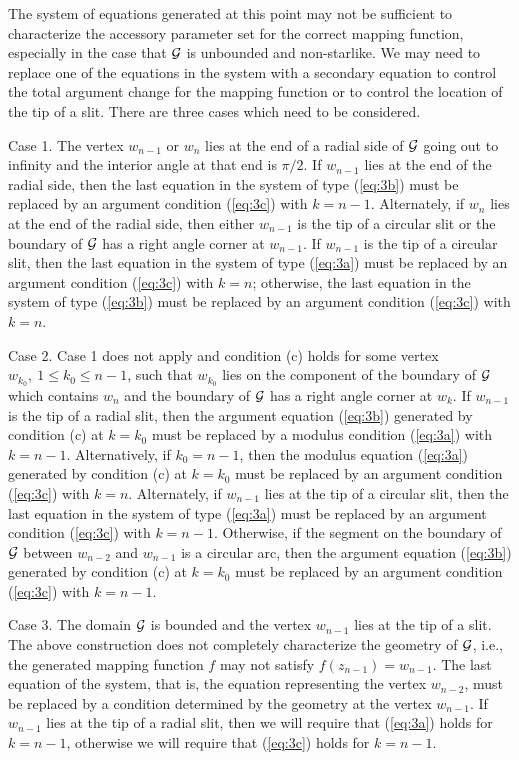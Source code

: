\documentclass[12pt]{article}%
\begin{document}
The system of equations generated at this point may not be sufficient
to characterize the accessory parameter set for the correct mapping
function, especially in the case that ${\cal G}$ is unbounded and
non-starlike.  We may need to replace one of the equations in the
system with a secondary equation to control the total argument
change for the mapping function or to control the location of the tip
of a slit.  There are three cases which need to be considered.

Case 1.  The vertex $w_{n-1}$ or $w_n$ lies at the end of a radial
side of ${\cal G}$ going out to infinity and the interior angle at
that end is $\pi/2$.  If $w_{n-1}$ lies at the end of the radial
side, then the last equation in the system of type (\ref{eq:3b}) must
be replaced by an argument condition (\ref{eq:3c}) with $k = n-1$.
Alternately, if $w_n$ lies at the end of the radial side, then either
$w_{n-1}$ is the tip of a circular slit or the boundary of ${\cal G}$
has a right angle corner at $w_{n-1}$.  If $w_{n-1}$ is the tip of a
circular slit, then the last equation in the system of type
(\ref{eq:3a}) must be replaced by an argument condition (\ref{eq:3c})
with $k =n$; otherwise, the last equation in the system of type
(\ref{eq:3b}) must be replaced by an argument condition (\ref{eq:3c})
with $k=n$.

Case 2.  Case 1 does not apply and condition (c) holds for some
vertex $w_{k_0},\ 1 \leq k_0 \leq n-1$, such that $w_{k_0}$ lies on
the component of the boundary of ${\cal G}$ which contains $w_n$ and
the boundary of ${\cal G}$ has a right angle corner at $w_k$.  If
$w_{n-1}$ is the tip of a radial slit, then the argument equation
(\ref{eq:3b}) generated by condition (c) at $k = k_0$ must be
replaced by a modulus condition (\ref{eq:3a}) with $k = n-1$.
Alternatively, if $k_0 = n-1$, then the modulus equation (\ref{eq:3a})
generated by condition (c) at $k = k_0$ must be replaced by an
argument condition (\ref{eq:3c}) with $k=n$.  Alternately, if
$w_{n-1}$ lies at the tip of a circular slit, then the last equation
in the system of type (\ref{eq:3a}) must be replaced by an argument
condition (\ref{eq:3c}) with $k = n-1$.  Otherwise, if the segment on
the boundary of ${\cal G}$ between $w_{n-2}$ and $w_{n-1}$ is a
circular arc, then the argument equation (\ref{eq:3b}) generated by
condition (c) at $k = k_0$ must be replaced by an argument condition (\ref{eq:3c})
with $k = n-1$.

Case 3.  The domain ${\cal G}$ is bounded and the vertex $w_{n-1}$
lies at the tip of a slit.  The above construction does not
completely characterize the geometry of ${\cal G}$, i.e., the
generated mapping function $f$ may not satisfy $f(z_{n-1}) =
w_{n-1}$.  The last equation of the system, that is, the equation
representing the vertex $w_{n-2}$, must be replaced by a condition
determined by the geometry at the vertex $w_{n-1}$.  If $w_{n-1}$
lies at the tip of a radial slit, then we will require that
(\ref{eq:3a}) holds for $k = n-1$, otherwise we will require that
(\ref{eq:3c}) holds for $k = n-1$.
\end{document}
